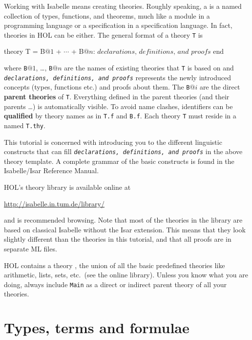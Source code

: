 Working with Isabelle means creating theories. Roughly speaking, a
 is a named collection of types, functions, and theorems,
much like a module in a programming language or a specification in a
specification language. In fact, theories in HOL can be either. The general
format of a theory \texttt{T} is
\begin{ttbox}
theory T = B\(@1\) + \(\cdots\) + B\(@n\):
\(\textit{declarations, definitions, and proofs}\)
end
\end{ttbox}
where \texttt{B}$@1$, \dots, \texttt{B}$@n$ are the names of existing
theories that \texttt{T} is based on and \texttt{\textit{declarations,
    definitions, and proofs}} represents the newly introduced concepts
(types, functions etc.) and proofs about them. The \texttt{B}$@i$ are the
direct \textbf{parent theories} of \texttt{T}.
Everything defined in the parent theories (and their parents \dots) is
automatically visible. To avoid name clashes, identifiers can be
\textbf{qualified} by theory names as in \texttt{T.f} and
\texttt{B.f}. Each theory \texttt{T} must
reside in a  named \texttt{T.thy}.

This tutorial is concerned with introducing you to the different linguistic
constructs that can fill \textit{\texttt{declarations, definitions, and
    proofs}} in the above theory template.  A complete grammar of the basic
constructs is found in the Isabelle/Isar Reference Manual.

HOL's theory library is available online at
\begin{center}\small
    \url{http://isabelle.in.tum.de/library/}
\end{center}
and is recommended browsing. Note that most of the theories in the library
are based on classical Isabelle without the Isar extension. This means that
they look slightly different than the theories in this tutorial, and that all
proofs are in separate ML files.

\begin{warn}
  HOL contains a theory , the union of all the basic
  predefined theories like arithmetic, lists, sets, etc.\ (see the online
  library).  Unless you know what you are doing, always include \texttt{Main}
  as a direct or indirect parent theory of all your theories.
\end{warn}


\section{Types, terms and formulae}
\label{sec:TypesTermsForms}

